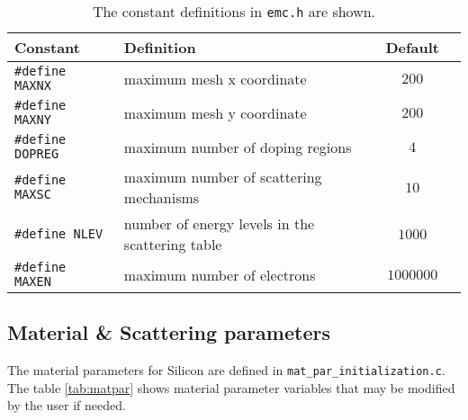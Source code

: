 \clearpage

\begin{table}[ht!]
\centering
\begin{tabular}{|l|p{9cm}|c|c|}
\hline
\textbf{Constant}        & \textbf{Definition}                               & \textbf{Default} \\
\hline
\texttt{\#define MAXNX}  & maximum mesh x coordinate                         &  $200$ \\
\hline
\texttt{\#define MAXNY}  & maximum mesh y coordinate                         &  $200$ \\
\hline
\texttt{\#define DOPREG} & maximum number of doping regions                  &  $4$ \\
\hline
\texttt{\#define MAXSC}  & maximum number of scattering mechanisms           &  $10$ \\
\hline
\texttt{\#define NLEV}   &  number of energy levels in the scattering table  &  $1000$ \\
\hline
\texttt{\#define MAXEN}  &  maximum number of electrons                      &  $1000000$\\
\hline
\end{tabular}
\caption{The constant definitions in \texttt{emc.h} are shown.}
\label{tab:emc}
\end{table}




\subsection{Material \& Scattering parameters}

The material parameters for Silicon are defined in \texttt{mat\_par\_initialization.c}. The table \ref{tab:matpar} shows material parameter variables that may be modified by the user if needed.


